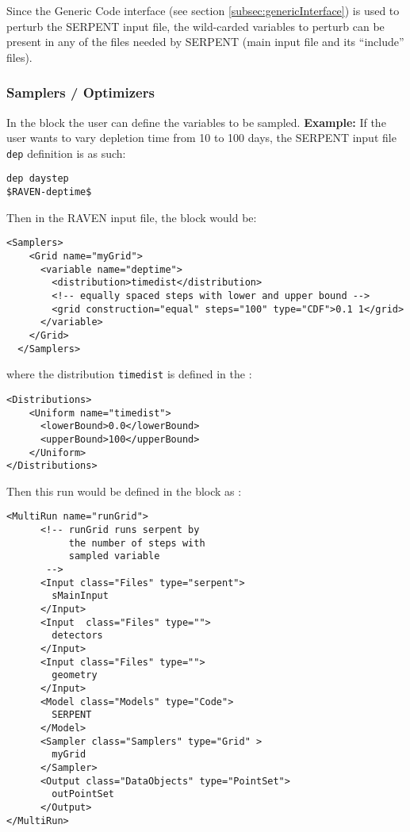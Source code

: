 \nb Since the Generic Code interface (see section  \ref{subsec:genericInterface})
      is used to perturb the SERPENT input file, the wild-carded variables to perturb
      can be present in any of the files needed by SERPENT (main input file and its ``include'' files).

\subsubsection{Samplers / Optimizers}
In the  block the user can define the variables
to be sampled.
\textbf{Example:} If the user wants to vary depletion time from
10 to 100 days, the SERPENT input file \texttt{dep} definition is as such:
\begin{lstlisting}
dep daystep 
$RAVEN-deptime$ 
\end{lstlisting}

Then in the RAVEN input file, the  block would be:
\begin{lstlisting}[style=XML]
  <Samplers>
    <Grid name="myGrid">
      <variable name="deptime">
        <distribution>timedist</distribution>
        <!-- equally spaced steps with lower and upper bound -->
        <grid construction="equal" steps="100" type="CDF">0.1 1</grid>
      </variable>
    </Grid>
  </Samplers>
\end{lstlisting}
where the distribution \texttt{timedist} is defined in the :
\begin{lstlisting}[style=XML]
  <Distributions>
    <Uniform name="timedist">
      <lowerBound>0.0</lowerBound>
      <upperBound>100</upperBound>
    </Uniform>
</Distributions>
\end{lstlisting}

Then this run would be defined in the  block as :
\begin{lstlisting}[style=XML]
<MultiRun name="runGrid">
      <!-- runGrid runs serpent by 
           the number of steps with
           sampled variable 
       -->
      <Input class="Files" type="serpent">
        sMainInput
      </Input>
      <Input  class="Files" type="">
        detectors
      </Input>
      <Input class="Files" type="">
        geometry
      </Input>
      <Model class="Models" type="Code">
        SERPENT
      </Model>
      <Sampler class="Samplers" type="Grid" >
        myGrid
      </Sampler>
      <Output class="DataObjects" type="PointSet">
        outPointSet
      </Output>
</MultiRun>
\end{lstlisting}

